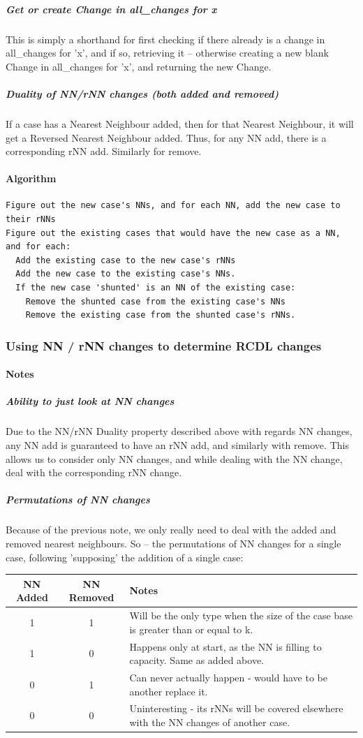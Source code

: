 \documentclass[a4paper,11pt]{report}
\begin{document}
\subparagraph{Get or create Change in all\_changes for x}
This is simply a shorthand for first checking if there already is a change in all\_changes for 'x', and if so, retrieving it – otherwise creating a new blank Change in all\_changes for 'x', and returning the new Change.

\subparagraph{Duality of NN/rNN changes (both added and removed)}
If a case has a Nearest Neighbour added, then for that Nearest Neighbour, it will get a Reversed Nearest Neighbour added. Thus, for any NN add, there is a corresponding rNN add. Similarly for remove.


\paragraph{Algorithm}

\begin{verbatim}
Figure out the new case's NNs, and for each NN, add the new case to their rNNs
Figure out the existing cases that would have the new case as a NN, and for each:
  Add the existing case to the new case's rNNs
  Add the new case to the existing case's NNs.
  If the new case 'shunted' is an NN of the existing case:
    Remove the shunted case from the existing case's NNs
    Remove the existing case from the shunted case's rNNs.
\end{verbatim}

\subsubsection{Using NN / rNN changes to determine RCDL changes}
\paragraph{Notes}
\subparagraph{Ability to just look at NN changes}
Due to the NN/rNN Duality property described above with regards NN changes, any NN add is guaranteed to have an rNN add, and similarly with remove. This allows us to consider only NN changes, and while dealing with the NN change, deal with the corresponding rNN change.

\subparagraph{Permutations of NN changes}
Because of the previous note, we only really need to deal with the added and removed nearest neighbours. So – the permutations of NN changes for a single case, following 'supposing' the addition of a single case:

\begin{tabular}{ | c | c | p{5cm} |}
	NN Added & NN Removed & Notes \\ \hline
	1 & 1 & Will be the only type when the size of the case base is greater than or equal to  k. \\ \hline
	1 & 0 & Happens only at start, as the NN is filling to capacity. Same as added above. \\ \hline
	0 & 1 & Can never actually happen - would have to be another replace it. \\ \hline
	0 & 0 & Uninteresting - its rNNs will be covered elsewhere with the NN changes of another case. \\ \hline
\end{tabular}
\end{document}
